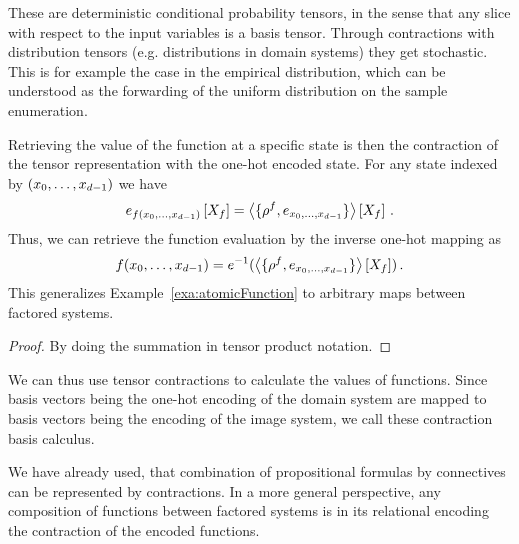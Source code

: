 These are deterministic conditional probability tensors, in the sense that any slice with respect to the input variables is a basis tensor.
Through contractions with distribution tensors (e.g. distributions in domain systems) they get stochastic.
This is for example the case in the empirical distribution, which can be understood as the forwarding of the uniform distribution on the sample enumeration.












\begin{theorem}\label{the:basisCalculus}
	Retrieving the value of the function at a specific state is then the contraction of the tensor representation with the one-hot encoded state.
	For any state indexed by $(x_{0},\ldots,x_{d-1})$ we have
		\[ e_{f(x_{0},\ldots,x_{d-1})}\left[X_{f}\right] 
		= \left\langle \{\rho^{f},e_{x_{0},\ldots,x_{d-1}}\}\right\rangle \left[ X_{f} \right] \, .\]
	Thus, we can retrieve the function evaluation by the inverse one-hot mapping as
		\[ f(x_{0},\ldots,x_{d-1}) 
		= e^{-1}(\left\langle \{\rho^{f},e_{x_{0},\ldots,x_{d-1}}\}\right\rangle \left[ X_{f} \right]) \, . \]
	This generalizes Example~\ref{exa:atomicFunction} to arbitrary maps between factored systems.
\end{theorem}
\begin{proof}
	By doing the summation in tensor product notation.
\end{proof}

We can thus use tensor contractions to calculate the values of functions.
Since basis vectors being the one-hot encoding of the domain system are mapped to basis vectors being the encoding of the image system, we call these contraction basis calculus.


We have already used, that combination of propositional formulas by connectives can be represented by contractions.
In a more general perspective, any composition of functions between factored systems is in its relational encoding the contraction of the encoded functions.

